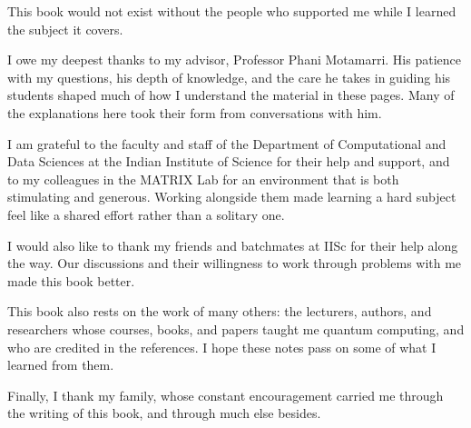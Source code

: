 \begin{Acknowledgements}
This book would not exist without the people who supported me while I learned the
subject it covers.

I owe my deepest thanks to my advisor, Professor Phani Motamarri. His patience with
my questions, his depth of knowledge, and the care he takes in guiding his students
shaped much of how I understand the material in these pages. Many of the
explanations here took their form from conversations with him.

I am grateful to the faculty and staff of the Department of Computational and Data
Sciences at the Indian Institute of Science for their help and support, and to my
colleagues in the MATRIX Lab for an environment that is both stimulating and
generous. Working alongside them made learning a hard subject feel like a shared
effort rather than a solitary one.

I would also like to thank my friends and batchmates at IISc for their help along
the way. Our discussions and their willingness to work through problems with me
made this book better.

This book also rests on the work of many others: the lecturers, authors, and
researchers whose courses, books, and papers taught me quantum computing, and who
are credited in the references. I hope these notes pass on some of what I learned
from them.

Finally, I thank my family, whose constant encouragement carried me through the
writing of this book, and through much else besides.
\end{Acknowledgements}
